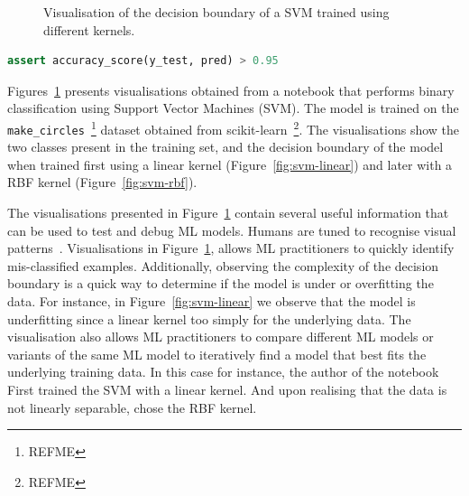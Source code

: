 \documentclass[conference]{IEEEtran}
\begin{document}
\begin{figure}
  \hfill
  \caption{Visualisation of the decision boundary of a SVM trained using different kernels.}\label{fig:svm}
\end{figure}

\begin{lstlisting}[language=Python, caption={Assertion on the accuracy of the ML model.}, label={lst:svm}]
assert accuracy_score(y_test, pred) > 0.95
\end{lstlisting}

Figures~\ref{fig:svm} presents visualisations obtained from a notebook that performs binary classification using Support Vector Machines (SVM). The model is trained on the \texttt{make\_circles}~\footnote{REFME} dataset obtained from scikit-learn~\footnote{REFME}. The visualisations show the two classes present in the training set, and the decision boundary of the model when trained first using a linear kernel (Figure~\ref{fig:svm-linear}) and later with a RBF kernel (Figure~\ref{fig:svm-rbf}).

The visualisations presented in Figure~\ref{fig:svm} contain several useful information that can be used to test and debug ML models. Humans are tuned to recognise visual patterns~\cite{CITEME}. Visualisations in Figure~\ref{fig:svm}, allows ML practitioners to quickly identify mis-classified examples. Additionally, observing the complexity of the decision boundary is a quick way to determine if the model is under or overfitting the data. For instance, in Figure~\ref{fig:svm-linear} we observe that the model is underfitting since a linear kernel too simply for the underlying data. The visualisation also allows ML practitioners to compare different ML models or variants of the same ML model to iteratively find a model that best fits the underlying training data. In this case for instance, the author of the notebook First trained the SVM with a linear kernel. And upon realising that the data is not linearly separable, chose the RBF kernel.
\end{document}
